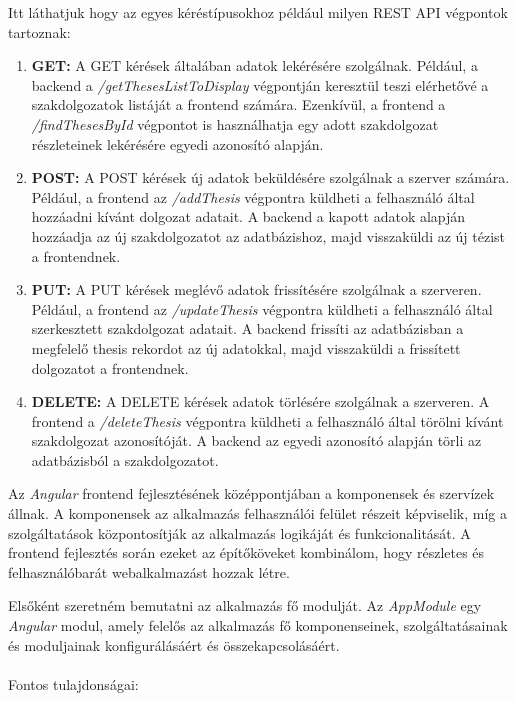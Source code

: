 Itt láthatjuk hogy az egyes kéréstípusokhoz például milyen REST API végpontok tartoznak:

\begin{enumerate}

\item{\textbf{GET:}}
A GET kérések általában adatok lekérésére szolgálnak. Például, a backend a \textit{/getThesesListToDisplay} végpontján keresztül teszi elérhetővé a szakdolgozatok listáját a frontend számára. Ezenkívül, a frontend a \textit{/findThesesById} végpontot is használhatja egy adott szakdolgozat részleteinek lekérésére egyedi azonosító alapján.

\item{\textbf{POST:}}
A POST kérések új adatok beküldésére szolgálnak a szerver számára. Például, a frontend az \textit{/addThesis} végpontra küldheti a felhasználó által hozzáadni kívánt dolgozat adatait. A backend a kapott adatok alapján hozzáadja az új szakdolgozatot az adatbázishoz, majd visszaküldi az új tézist a frontendnek.

\item{\textbf{PUT:}}
A PUT kérések meglévő adatok frissítésére szolgálnak a szerveren. Például, a frontend az \textit{/updateThesis} végpontra küldheti a felhasználó által szerkesztett szakdolgozat adatait. A backend frissíti az adatbázisban a megfelelő thesis rekordot az új adatokkal, majd visszaküldi a frissített dolgozatot a frontendnek.

\item{\textbf{DELETE:}}
A DELETE kérések adatok törlésére szolgálnak a szerveren. A frontend a \textit{/deleteThesis} végpontra küldheti a felhasználó által törölni kívánt szakdolgozat azonosítóját. A backend az egyedi azonosító alapján törli az adatbázisból a szakdolgozatot.

\end{enumerate}



Az \textit{Angular} \cite{angular} frontend fejlesztésének középpontjában a komponensek és szervízek állnak. A komponensek az alkalmazás felhasználói felület részeit képviselik, míg a szolgáltatások központosítják az alkalmazás logikáját és funkcionalitását. A frontend fejlesztés során ezeket az építőköveket kombinálom, hogy részletes és felhasználóbarát webalkalmazást hozzak létre.

Elsőként szeretném bemutatni az alkalmazás fő modulját. Az \textit{AppModule} egy \textit{Angular} modul, amely felelős az alkalmazás fő komponenseinek, szolgáltatásainak és moduljainak konfigurálásáért és összekapcsolásáért. \\
\\Fontos tulajdonságai:

